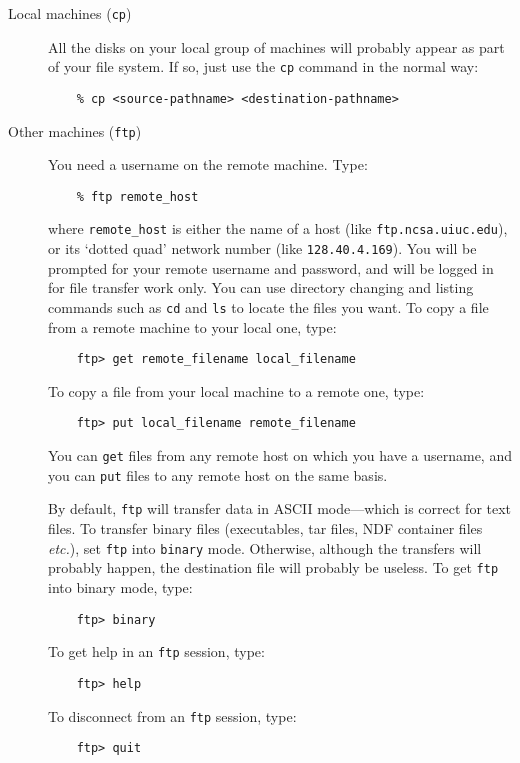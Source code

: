 \begin{description}
\begin{description}

\item [Local machines ({\tt cp})] \hspace*{\fill}

All the disks on your local group of machines will probably appear as part of
your file system.
If so, just use the {\tt cp} command in the normal way:
\begin{verbatim}
    % cp <source-pathname> <destination-pathname>
\end{verbatim}

\item [Other machines ({\tt ftp})] \hspace*{\fill}

You need a username on the remote machine.
Type:
\begin{verbatim}
    % ftp remote_host
\end{verbatim}
where {\tt remote\_host} is either the name of a host (like
{\tt ftp.ncsa.uiuc.edu}), or its `dotted quad' network number (like
{\tt 128.40.4.169}).
You will be prompted for your remote username and password, and will be
logged in for file transfer work only.
You can use directory changing and listing commands such as {\tt cd} and
{\tt ls} to locate the files you want.
To copy a file from a remote machine to your local one, type:
\begin{verbatim}
    ftp> get remote_filename local_filename
\end{verbatim}
To copy a file from your local machine to a remote one, type:
\begin{verbatim}
    ftp> put local_filename remote_filename
\end{verbatim}
You can {\tt get} files from any remote host on which you have a username,
and you can {\tt put} files to any remote host on the same basis.

By default, {\tt ftp} will transfer data in ASCII mode---which is correct for
text files.
To transfer binary files (executables, tar files, NDF container files
{\em etc.}), set {\tt ftp} into {\tt binary} mode.
Otherwise, although the transfers will probably happen, the destination file
will probably be useless. 
To get {\tt ftp} into binary mode, type:
\begin{verbatim}
    ftp> binary
\end{verbatim}
To get help in an {\tt ftp} session, type:
\begin{verbatim}
    ftp> help
\end{verbatim}
To disconnect from an {\tt ftp} session, type:
\begin{verbatim}
    ftp> quit
\end{verbatim}
\end{description}
\end{description}
